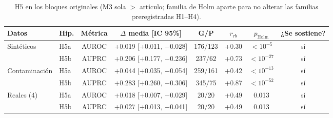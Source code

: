 \begin{table}[t]
\centering\small
\caption{H5 en los bloques originales (M3 sola $>$ artículo; familia de Holm aparte para no alterar las familias preregistradas H1--H4).}
\label{tab:h5}
\begin{tabular}{llcccccc}
\toprule
Datos & Hip. & Métrica & $\Delta$ media [IC 95\%] & G/P & $r_{rb}$ & $p_{\text{Holm}}$ & ¿Se sostiene? \\
\midrule
Sintéticos & H5a & AUROC & +0.019 [+0.011, +0.028] & 176/123 & +0.30 & $<10^{-5}$ & sí \\
 & H5b & AUPRC & +0.206 [+0.177, +0.236] & 237/62 & +0.73 & $<10^{-27}$ & sí \\
\midrule
Contaminación & H5a & AUROC & +0.044 [+0.035, +0.054] & 259/161 & +0.42 & $<10^{-13}$ & sí \\
 & H5b & AUPRC & +0.283 [+0.260, +0.306] & 345/75 & +0.87 & $<10^{-52}$ & sí \\
\midrule
Reales (4) & H5a & AUROC & +0.018 [+0.007, +0.029] & 20/20 & +0.49 & 0.013 & sí \\
 & H5b & AUPRC & +0.027 [+0.013, +0.041] & 20/20 & +0.49 & 0.013 & sí \\
\bottomrule
\end{tabular}
\end{table}
